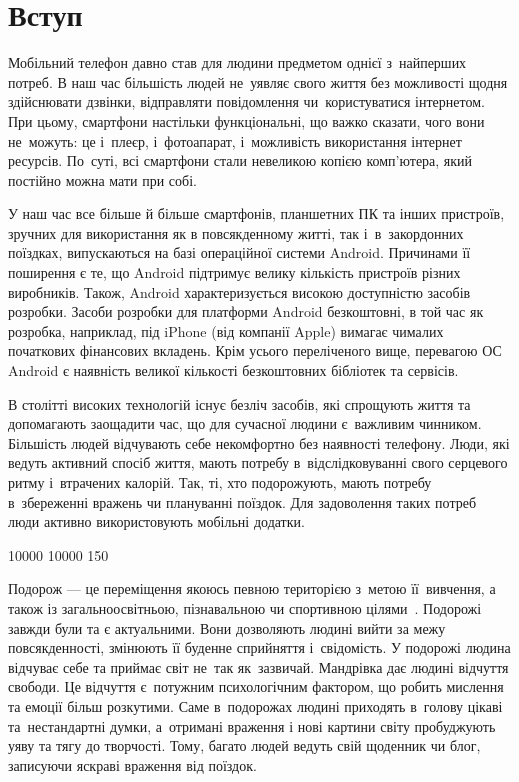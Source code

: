 \documentclass[../main.tex]{subfiles}
\begin{document}
\chapter*{Вступ}

Мобільний телефон давно став для людини предметом однієї з~найперших потреб. В наш час більшість людей не~уявляє свого життя без можливості щодня здійснювати дзвінки, відправляти повідомлення чи~користуватися інтернетом. При цьому, смартфони настільки функціональні, що важко сказати, чого вони не~можуть: це і~плеєр, і~фотоапарат, і~можливість використання інтернет ресурсів. По~суті, всі смартфони стали невеликою копією комп'ютера, який постійно можна мати при собі.

У наш час все більше й більше смартфонів, планшетних ПК та інших пристроїв, зручних для використання як в повсякденному житті, так і~в~закордонних поїздках, випускаються на базі операційної системи Android. Причинами її поширення є те, що Android підтримує велику кількість пристроїв різних виробників. Також, Android характеризується високою доступністю засобів розробки. Засоби розробки для платформи Android безкоштовні, в той час як розробка, наприклад, під iPhone (від компанії Apple) вимагає чималих початкових фінансових вкладень. Крім усього переліченого вище, перевагою ОС Android є наявність великої кількості безкоштовних бібліотек та сервісів.

В столітті високих технологій існує безліч засобів, які спрощують життя та допомагають заощадити час, що для сучасної людини є~важливим чинником. Більшість людей відчувають себе некомфортно без наявності телефону. Люди, які ведуть активний спосіб життя, мають потребу в~відслідковуванні свого серцевого ритму і~втрачених калорій. Так, ті, хто подорожують, мають потребу в~збереженні вражень чи плануванні поїздок. Для задоволення таких потреб люди активно використовують мобільні додатки.

{
 10000 10000 150	

Подорож — це переміщення якоюсь певною територією з~метою її~вивчення, а також із загальноосвітньою, пізнавальною чи спортивною цілями~\cite{travel}. Подорожі завжди були та є актуальними. Вони дозволяють людині вийти за межу повсякденності, змінюють її буденне сприйняття і~свідомість. У подорожі людина відчуває себе та приймає світ не~так як~зазвичай. Мандрівка дає людині відчуття свободи. Це відчуття є~потужним психологічним фактором, що робить мислення та емоції більш розкутими. Саме в~подорожах людині приходять в~голову цікаві та~нестандартні думки, а~отримані враження і нові картини світу пробуджують уяву та тягу до творчості. Тому, багато людей ведуть свій щоденник чи блог, записуючи яскраві враження від поїздок.
	
}
\end{document}
